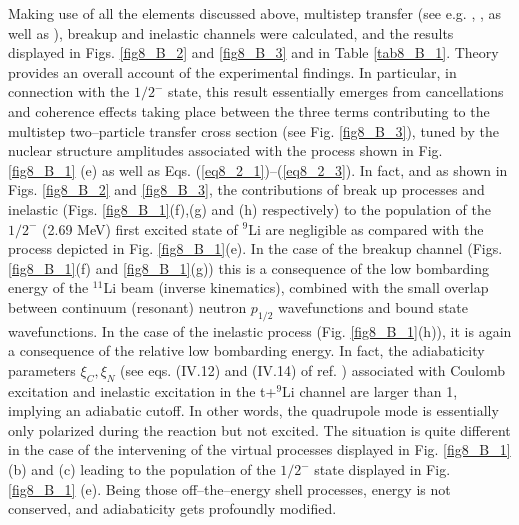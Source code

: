 \begin{subappendices}
 Making use of all the elements discussed above, multistep transfer (see e.g. \cite{Bayman:82}, \cite{Igarashi:91},  \cite{Bayman:73} as well as \cite{Broglia:04a}), breakup and inelastic channels were calculated, and the results displayed in Figs. \ref{fig8_B_2} and \ref{fig8_B_3} and in Table \ref{tab8_B_1}. Theory provides an overall account of the experimental findings. In particular, in connection with the $1/2^-$ state, this result essentially emerges from cancellations and coherence effects taking place between the three terms contributing to the multistep two--particle transfer cross section (see Fig. \ref{fig8_B_3}), tuned by the nuclear structure amplitudes associated with the process shown in Fig. \ref{fig8_B_1} (e) as well as Eqs. (\ref{eq8_2_1})--(\ref{eq8_2_3}). In fact, and
as shown in Figs. \ref{fig8_B_2} and \ref{fig8_B_3}, the contributions of break up processes and inelastic   (Figs. \ref{fig8_B_1}(f),(g) and (h) respectively) to the population of the $1/2^-$ (2.69 MeV) first excited state of $^9$Li are negligible as compared with the process depicted in Fig. \ref{fig8_B_1}(e). In the case of the breakup channel (Figs. \ref{fig8_B_1}(f) and \ref{fig8_B_1}(g)) this is a consequence of the low bombarding energy of the $^{11}$Li beam (inverse kinematics), combined with the small overlap between continuum (resonant) neutron $p_{1/2}$ wavefunctions and  bound state wavefunctions. In the case of the inelastic process (Fig. \ref{fig8_B_1}(h)), it is again a consequence of the relative low bombarding energy. In fact, the adiabaticity parameters $\xi_C,\xi_N$ (see eqs. (IV.12) and (IV.14) of ref. \cite{Broglia:04a}) associated with Coulomb excitation and inelastic excitation in the t+$^9$Li channel are larger than 1, implying an adiabatic cutoff. In other words, the quadrupole mode is essentially only polarized during the reaction but not excited. The situation is quite different in the case of the intervening of the virtual processes  displayed in Fig. \ref{fig8_B_1} (b) and (c) leading to the population of the $1/2^-$ state displayed in Fig. \ref{fig8_B_1} (e). Being those off--the--energy shell processes, energy is not conserved, and adiabaticity gets profoundly modified.


\end{subappendices}
